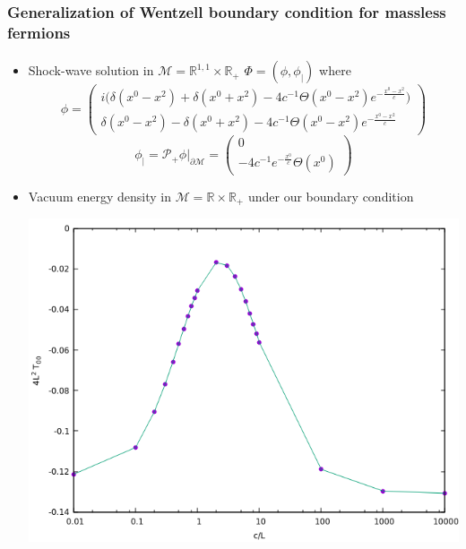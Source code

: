 \documentclass[english]{beamer}
\begin{document}
\begin{frame}[shrink=30]
\frametitle{\small{Generalization of Wentzell boundary condition for massless fermions}}
\framesubtitle{}

\begin{itemize}

\item<1-> Shock-wave solution in $\mathcal{M} = \mathbb{R}^{1,1}\times\mathbb{R}_+$ $\Phi = (\phi, \phi_|)$
where
\begin{equation*}
\phi = \begin{pmatrix}
i \big(\delta(x^0 - x^2) + \delta(x^0 + x^2) - 4c^{-1}\Theta(x^0-x^2)e^{- \frac{x^0-x^2}{c}} \big) \\
\delta({x^0 - x^2}) - \delta(x^0 + x^2) - 4c^{-1}\Theta(x^0-x^2)e^{- \frac{x^0-x^2}{c}} \end{pmatrix}
\end{equation*}
\begin{equation*}
\phi_| = \mathcal{P}_+ \phi\vert_{\partial \mathcal{M}} = 
\begin{pmatrix} 0 \\ -4c^{-1}e^{- \frac{x^0}{c}} \Theta(x^0) \end{pmatrix}
\end{equation*}


\item<2-> Vacuum energy density in $\mathcal{M} = \mathbb{R}\times\mathbb{R}_+$ under our boundary condition
		
	\includegraphics[scale=0.5]{T00}\centering



\end{itemize}

\end{frame}
\end{document}
